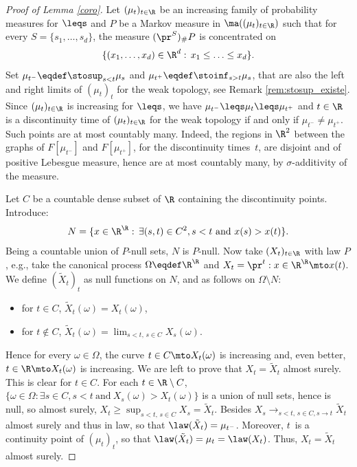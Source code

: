 \begin{proof}[Proof of Lemma \ref{coro}]
Let $(\mu_t)_{t\in \R}$ be an increasing family of probability measures for $\leqs$ and $P$ be a Markov measure in $\ma((\mu_t)_{t\in \R})$ such that for every $S=\{s_1,\ldots,s_d\}$, the measure $(\pr^S)_\#P$ is concentrated on
\[
\{(x_1,\ldots,x_d)\in \R^d:\,x_1\leq\ldots \leq x_d\}.
\]
Set $\mu_{t^-}\eqdef\stosup_{s<t}\mu_s$ and $\mu_{t^+}\eqdef\stoinf_{s>t}\mu_s$, that are also the left and right limits of $(\mu_t)_t$ for the weak topology, see Remark \ref{rem:stosup_existe}. Since $(\mu_t)_{t\in \R}$ is increasing for $\leqs$, we have $\mu_{t^-}\leqs \mu_t \leqs \mu_{t^+}$ and $t\in\R$ is a discontinuity time of $(\mu_t)_{t\in \R}$ for the weak topology if and only if $\mu_{t^-}\neq\mu_{t^+}$. Such points are at most countably many. Indeed, the regions in $\R^2$ between the graphs of $F[\mu_{t^-}]$ and $F[\mu_{t^+}]$, for the discontinuity times~$t$, are disjoint and of positive Lebesgue measure, hence are at most countably many, by $\sigma$-additivity of the measure.

Let $C$ be a countable dense subset of $\R$ containing the discontinuity points. Introduce:\vspace*{-3pt}
\[N=\{x\in \R^\R:\,\exists (s,t)\in C^2, s<t\text{ and }x(s)>x(t)\}
.\]
Being a countable union of $P$-null sets, $N$ is $P$-null. Now take $(X_t)_{t\in \R}$ with law $P$, e.g., take the canonical process $\Omega\eqdef\R^\R$ and $X_t=\pr^t:x\in \R^\R\mto x(t)$. We define $(\tilde X_t)_{t}$ as null functions on $N$, and as follows on $\Omega\setminus N$:
\begin{itemize}
\item
for $t\in C$, $\tilde X_t(\omega)=X_t(\omega)$,

\item
for $t\notin C$, $\tilde X_t(\omega)=\lim_{s<t,\,s\in C}X_s(\omega)$.

\end{itemize}
Hence for every $\omega\in \Omega$, the curve $t\in C\mto X_t(\omega)$ is increasing and, even better, $t\in \R\mto X_t(\omega)$ is increasing. We are left to prove that $X_t=\tilde X_t$ almost surely. This is clear for $t\in C$. For each $t\in\R\setminus C$, $\{\omega\in\Omega:\exists s\in C, s<t\ \text{and}\ X_s(\omega)>X_t(\omega)\}$ is a union of null sets, hence is null, so almost surely, $X_t\geqslant \sup_{s<t,\,s\in C}X_s=\tilde X_t$. Besides $X_s\to_{s<t,\,s\in C, s\to t}\tilde{X}_t$ almost surely and thus in law, so that $\law(\tilde X_t)=\mu_{t^-}$. Moreover, $t$~is a continuity point of $(\mu_t)_t$, so that $\law(\tilde X_t)=\mu_{t}=\law(X_t)$. Thus, $X_t=\tilde{X}_t$ almost surely.
\end{proof}

